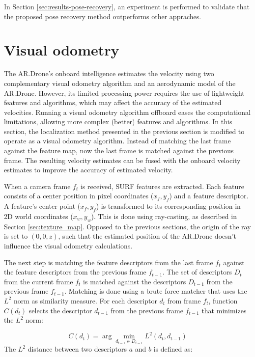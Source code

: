In Section \ref{sec:results-pose-recovery}, an experiment is performed to validate that the proposed pose recovery method outperforms other appraches.



\section{Visual odometry}
\label{sec:visual-slam-visual-odemetry}
The AR.Drone's onboard intelligence estimates the velocity using two complementary visual odometry algorithm and an aerodynamic model of the AR.Drone.
However, its limited processing power requires the use of lightweight features and algorithms, which may affect the accuracy of the estimated velocities.
Running a visual odometry algorithm offboard eases the computational limitations, allowing more complex (better) features and algorithms.
In this section, the localization method presented in the previous section is modified to operate as a visual odometry algorithm.
Instead of matching the last frame against the feature map, now the last frame is matched against the previous frame.
The resulting velocity estimates can be fused with the onboard velocity estimates to improve the accuracy of estimated velocity.

When a camera frame $f_t$ is received, SURF features are extracted.
Each feature consists of a center position in pixel coordinates ($x_f, y_f$) and a feature descriptor.
A feature's center point ($x_f, y_f$) is transformed to its corresponding position in 2D world coordinates ($x_w, y_w$).
This is done using ray-casting, as described in Section \ref{sec:texture_map}.
Opposed to the previous sections, the origin of the ray is set to $(0, 0, z)$, such that the estimated position of the AR.Drone doesn't influence the visual odometry calculations.

The next step is matching the feature descriptors from the last frame $f_t$ against the feature descriptors from the previous frame $f_{t-1}$.
The set of descriptors $D_{t}$ from the current frame $f_t$ is matched against the descriptors $D_{t-1}$ from the previous frame $f_{t-1}$.
Matching is done using a brute force matcher that uses the $L^2$ norm as similarity measure.
For each descriptor $d_{t}$ from frame $f_t$, function $C(d_{t})$ selects the descriptor $d_{t-1}$ from the previous frame $f_{t-1}$ that minimizes the $L^2$ norm:

\begin{equation}
C(d_{t}) = \arg\min_{d_{t-1} \in D_{t-1}} L^2(d_t, d_{t-1})
\end{equation}
The $L^2$ distance between two descriptors $a$ and $b$ is defined as:

